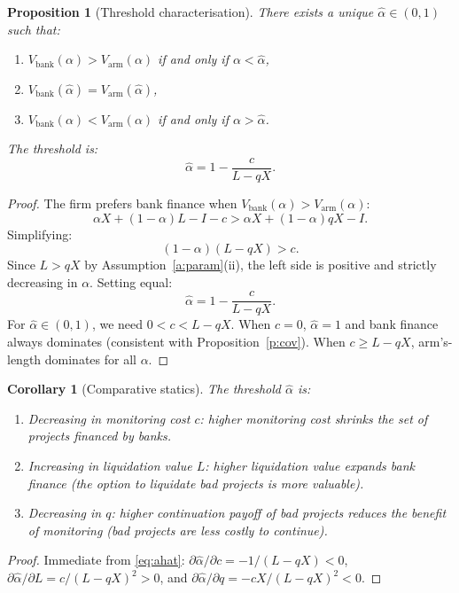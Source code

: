 \documentclass[12pt,a4paper]{article}
\theoremstyle{plain}
\newtheorem{proposition}[theorem]{Proposition}
\newtheorem{corollary}[theorem]{Corollary}
\theoremstyle{definition}
\theoremstyle{remark}
\begin{document}
\begin{proposition}[Threshold characterisation]\label{p:thresh}
There exists a unique $\hat{\alpha} \in (0,1)$ such that:
\begin{enumerate}[nosep,label=(\alph*)]
\item $V_{\text{bank}}(\alpha) > V_{\text{arm}}(\alpha)$ if and only if $\alpha < \hat{\alpha}$,
\item $V_{\text{bank}}(\hat{\alpha}) = V_{\text{arm}}(\hat{\alpha})$,
\item $V_{\text{bank}}(\alpha) < V_{\text{arm}}(\alpha)$ if and only if $\alpha > \hat{\alpha}$.
\end{enumerate}
The threshold is:
\begin{equation}\label{eq:ahat}
\hat{\alpha} = 1 - \frac{c}{L - qX}.
\end{equation}
\end{proposition}

\begin{proof}
The firm prefers bank finance when $V_{\text{bank}}(\alpha) > V_{\text{arm}}(\alpha)$:
\[
\alpha X + (1-\alpha)L - I - c > \alpha X + (1-\alpha)qX - I.
\]
Simplifying:
\[
(1-\alpha)(L - qX) > c.
\]
Since $L > qX$ by Assumption~\ref{a:param}(ii), the left side is positive and strictly decreasing in $\alpha$. Setting equal:
\[
\hat{\alpha} = 1 - \frac{c}{L - qX}.
\]
For $\hat{\alpha} \in (0,1)$, we need $0 < c < L - qX$. When $c = 0$, $\hat{\alpha} = 1$ and bank finance always dominates (consistent with Proposition~\ref{p:cov}). When $c \geq L - qX$, arm's-length dominates for all $\alpha$.
\end{proof}

\begin{corollary}[Comparative statics]\label{c:compstat}
The threshold $\hat{\alpha}$ is:
\begin{enumerate}[nosep,label=(\roman*)]
\item Decreasing in monitoring cost $c$: higher monitoring cost shrinks the set of projects financed by banks.
\item Increasing in liquidation value $L$: higher liquidation value expands bank finance (the option to liquidate bad projects is more valuable).
\item Decreasing in $q$: higher continuation payoff of bad projects reduces the benefit of monitoring (bad projects are less costly to continue).
\end{enumerate}
\end{corollary}

\begin{proof}
Immediate from \eqref{eq:ahat}: $\partial \hat{\alpha}/\partial c = -1/(L-qX) < 0$, $\partial \hat{\alpha}/\partial L = c/(L-qX)^2 > 0$, and $\partial \hat{\alpha}/\partial q = -cX/(L-qX)^2 < 0$.
\end{proof}
\end{document}
